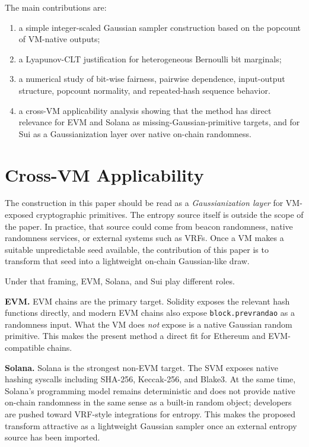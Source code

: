 \documentclass[11pt]{article}
\begin{document}
The main contributions are:
\begin{enumerate}
\item a simple integer-scaled Gaussian sampler construction based on the
popcount of VM-native outputs;
\item a Lyapunov-CLT justification for heterogeneous Bernoulli bit marginals;
\item a numerical study of bit-wise fairness, pairwise dependence, input-output
structure, popcount normality, and repeated-hash sequence behavior.
\item a cross-VM applicability analysis showing that the method has direct
relevance for EVM and Solana as missing-Gaussian-primitive targets, and for
Sui as a Gaussianization layer over native on-chain randomness.
\end{enumerate}

\section{Cross-VM Applicability}

The construction in this paper should be read as a \emph{Gaussianization layer}
for VM-exposed cryptographic primitives. The entropy source itself is outside
the scope of the paper. In practice, that source could come from beacon
randomness, native randomness services, or external systems such as VRFs. Once a
VM makes a suitable unpredictable seed available, the contribution of this
paper is to transform that seed into a lightweight on-chain Gaussian-like draw.

Under that framing, EVM, Solana, and Sui play different roles.

\textbf{EVM.} EVM chains are the primary target. Solidity exposes the relevant
hash functions directly, and modern EVM chains also expose
\texttt{block.prevrandao} as a randomness input. What the VM does \emph{not}
expose is a native Gaussian random primitive. This makes the present method a
direct fit for Ethereum and EVM-compatible chains.

\textbf{Solana.} Solana is the strongest non-EVM target. The SVM exposes native
hashing syscalls including SHA-256, Keccak-256, and Blake3. At the same time,
Solana's programming model remains deterministic and does not provide native
on-chain randomness in the same sense as a built-in random object; developers
are pushed toward VRF-style integrations for entropy. This makes the proposed
transform attractive as a lightweight Gaussian sampler once an external entropy
source has been imported.
\end{document}
